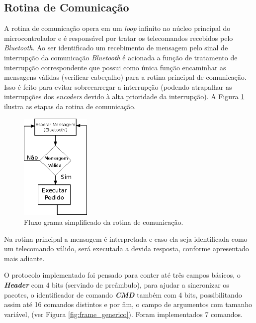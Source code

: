 \subsection{Rotina de Comunicação}
\label{subsec:rotina_comunicacao}
A rotina de comunicação opera em um \emph{loop} infinito no núcleo principal do microcontrolador e é responsável por tratar os telecomandos recebidos pelo \textit{Bluetooth}. Ao ser identificado um recebimento de mensagem pelo sinal de interrupção da comunicação \textit{Bluetooth} é acionada a função de tratamento de interrupção correspondente que possui como única função encaminhar as mensagens válidas (verificar cabeçalho) para a rotina principal de comunicação. Isso é feito para evitar sobrecarregar a interrupção (podendo atrapalhar as interrupções dos \emph{encoders} devido à alta prioridade da interrupção). A Figura \ref{fig:ilustracao_rotina_comunicacao} ilustra as etapas da rotina de comunicação.\\

\begin{figure}[H]
    \centering
    \includegraphics[width=0.3\textwidth]{figuras/ilustracoes/ilustracao_rotina_de_comunicacao.eps}
    \caption{Fluxo grama simplificado da rotina de comunicação.}
    \label{fig:ilustracao_rotina_comunicacao}
\end{figure}

Na rotina principal a mensagem é interpretada e caso ela seja identificada como um telecomando válido, será executada a devida resposta, conforme apresentado mais adiante.

O protocolo implementado foi pensado para conter até três campos básicos, o \textbf{\textit{Header}} com 4 bits (servindo de preâmbulo), para ajudar a sincronizar os pacotes, o identificador de comando \textbf{\textit{CMD}} também com 4 bits, possibilitando assim até 16 comandos distintos e por fim, o campo de argumentos com tamanho variável, (ver Figura \ref{fig:frame_generico}). Foram implementados 7 comandos.

